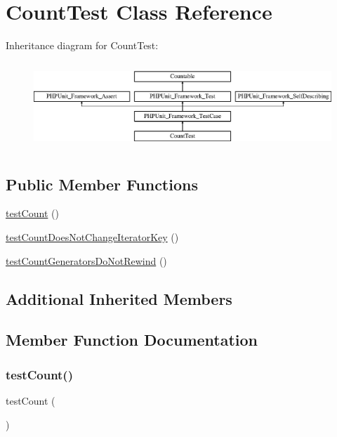\hypertarget{class_count_test}{}\section{Count\+Test Class Reference}
\label{class_count_test}
Inheritance diagram for Count\+Test\+:\begin{figure}[H]
\begin{center}
\leavevmode
\includegraphics[height=3.303835cm]{class_count_test}
\end{center}
\end{figure}
\subsection*{Public Member Functions}
\begin{DoxyCompactItemize}
\item 
\mbox{\hyperlink{class_count_test_ac444346b03fc5be31a27ecfb506e3a3a}{test\+Count}} ()
\item 
\mbox{\hyperlink{class_count_test_a556186f47c69eb5676b57c1c206ad84f}{test\+Count\+Does\+Not\+Change\+Iterator\+Key}} ()
\item 
\mbox{\hyperlink{class_count_test_ab115202819121ca5c72f9c87955f2c9f}{test\+Count\+Generators\+Do\+Not\+Rewind}} ()
\end{DoxyCompactItemize}
\subsection*{Additional Inherited Members}


\subsection{Member Function Documentation}
\mbox{\label{class_count_test_ac444346b03fc5be31a27ecfb506e3a3a}} 
\subsubsection{\texorpdfstring{test\+Count()}{testCount()}}
{\footnotesize\ttfamily test\+Count (\begin{DoxyParamCaption}{ }\end{DoxyParamCaption})}


